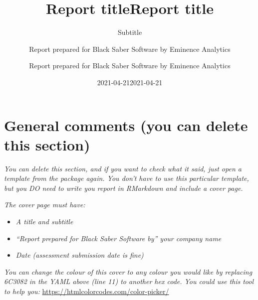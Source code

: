 \documentclass[
          english,
          paper=a4,
              ,captions=tableheading
  ]{scrartcl}
\title{Report title}
\subtitle{Subtitle}
\author{Report prepared for Black Saber Software by Eminence Analytics}
\date{2021-04-21}
\title{Report title}
\author{Report prepared for Black Saber Software by Eminence Analytics}
\date{2021-04-21}
\providecommand{\tightlist}{%
        \setlength{\itemsep}{0pt}\setlength{\parskip}{0pt}}
\begin{document}
\begin{titlepage}
\afterpage{\restorepagecolor}
\newcommand{\colorRule}[3][black]{\textcolor[HTML]{#1}{\rule{#2}{#3}}}
\end{titlepage}
\restoregeometry




{
\setcounter{tocdepth}{2}
\tableofcontents
}
\hypertarget{general-comments-you-can-delete-this-section}{%
\section{General comments (you can delete this
section)}\label{general-comments-you-can-delete-this-section}}

\emph{You can delete this section, and if you want to check what it
said, just open a template from the package again. You don't have to use
this particular template, but you DO need to write you report in
RMarkdown and include a cover page.}

\emph{The cover page must have:}

\begin{itemize}
\tightlist
\item
  \emph{A title and subtitle}
\item
  \emph{\enquote{Report prepared for Black Saber Software by} your
  company name}
\item
  \emph{Date (assessment submission date is fine)}
\end{itemize}

\emph{You can change the colour of this cover to any colour you would
like by replacing 6C3082 in the YAML above (line 11) to another hex
code. You could use this tool to help you:}
\url{https://htmlcolorcodes.com/color-picker/}
\end{document}
